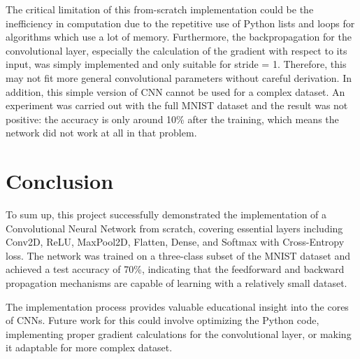 \documentclass[conference]{IEEEtran}
\begin{document}
The critical limitation of this from-scratch implementation could be the inefficiency in computation due to the repetitive use of Python lists and loops for algorithms which use a lot of memory. Furthermore, the backpropagation for the convolutional layer, especially the calculation of the gradient with respect to its input, was simply implemented and only suitable for stride = 1. Therefore, this may not fit more general convolutional parameters without careful derivation. In addition, this simple version of CNN cannot be used for a complex dataset. An experiment was carried out with the full MNIST dataset and the result was not positive: the accuracy is only around 10\% after the training, which means the network did not work at all in that problem. 

\section{Conclusion}
To sum up, this project successfully demonstrated the implementation of a Convolutional Neural Network from scratch, covering essential layers including Conv2D, ReLU, MaxPool2D, Flatten, Dense, and Softmax with Cross-Entropy loss. The network was trained on a three-class subset of the MNIST dataset and achieved a test accuracy of 70\%, indicating that the feedforward and backward propagation mechanisms are capable of learning with a relatively small dataset.

The implementation process provides valuable educational insight into the cores of CNNs. Future work for this could involve optimizing the Python code, implementing proper gradient calculations for the convolutional layer, or making it adaptable for more complex dataset.
\end{document}
